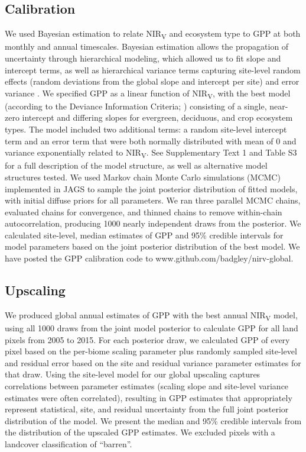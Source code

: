 \documentclass[10pt,letterpaper]{article}
\begin{document}
\subsection*{Calibration}
We used Bayesian estimation to relate NIR\textsubscript{V} and ecosystem type to GPP at both monthly and annual timescales. Bayesian estimation allows the propagation of uncertainty through hierarchical modeling, which allowed us to fit slope and intercept terms, as well as hierarchical variance terms capturing site-level random effects (random deviations from the global slope and intercept per site) and error variance \cite{Gelman1995}. We specified GPP as a linear function of NIR\textsubscript{V}, with the best model (according to the Deviance Information Criteria; \citep{Gelman1995}) consisting of a single, near-zero intercept and differing slopes for evergreen, deciduous, and crop ecosystem types.  The model included two additional terms: a random site-level intercept term and an error term that were both normally distributed with mean of 0 and variance exponentially related to NIR\textsubscript{V}. See Supplementary Text 1 and Table S3 for a full description of the model structure, as well as alternative model structures tested. 
We used Markov chain Monte Carlo simulations (MCMC) implemented in JAGS \cite{JAGS} to sample the joint posterior distribution of fitted models, with initial diffuse priors for all parameters. We ran three parallel MCMC chains, evaluated chains for convergence, and thinned chains to remove within-chain autocorrelation, producing 1000 nearly independent draws from the posterior. We calculated site-level, median estimates of GPP and 95\% credible intervals for model parameters based on the joint posterior distribution of the best model.  We have posted the GPP calibration code to www.github.com/badgley/nirv-global.

\subsection*{Upscaling}
\raggedbottom
We produced global annual estimates of GPP with the best annual NIR\textsubscript{V} model, using all 1000 draws from the joint model posterior to calculate GPP for all land pixels from 2005 to 2015. For each posterior draw, we calculated GPP of every pixel based on the per-biome scaling parameter plus randomly sampled site-level and residual error based on the site and residual variance parameter estimates for that draw. Using the site-level model for our global upscaling captures correlations between parameter estimates (scaling slope and site-level variance estimates were often correlated), resulting in GPP estimates that appropriately represent statistical, site, and residual uncertainty from the full joint posterior distribution of the model. We present the median and 95\% credible intervals from the distribution of the upscaled GPP estimates. We excluded pixels with a landcover classification of ``barren''.
\end{document}
